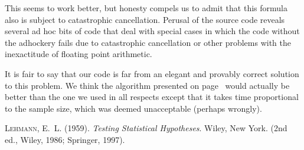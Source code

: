 \documentclass{article}
\begin{document}
This seems to work better, but honesty compels us to admit that this formula
also is subject to catastrophic cancellation.  Perusal of the source code
reveals several ad hoc bits of code that deal with special cases
in which the code without the adhockery fails due to catastrophic cancellation
or other problems with the inexactitude of floating point arithmetic.

It is fair to say that our code is far from an elegant and provably correct
solution to this problem.  We think the algorithm presented
on page~\pageref{pg:algo} would actually be better than the one we used
in all respects except that it takes time proportional to the sample size,
which was deemed unacceptable (perhaps wrongly).







\begin{thebibliography}{}

\textsc{Lehmann, E.~L.} (1959).
\newblock \emph{Testing Statistical Hypotheses}.
\newblock Wiley, New York.
\newblock (2nd ed., Wiley, 1986; Springer, 1997).

\end{thebibliography}
\end{document}
